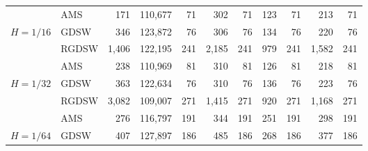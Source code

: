 \begin{table}[H]
\begin{tabular}{llrrrrrrrrr}
\cline{2-11}
\bfseries  & AMS & 171 & {\cellcolor[HTML]{E2E4FB}} \color[HTML]{000000} 110,677 & 71 & {\cellcolor[HTML]{ACB8F4}} \color[HTML]{000000} 302 & 71 & {\cellcolor[HTML]{768BEC}} \color[HTML]{F1F1F1} 123 & 71 & {\cellcolor[HTML]{405FE5}} \color[HTML]{F1F1F1} 213 & 71 \\
\cline{1-11} \cline{2-11}
\multirow[c]{3}{*}{\bfseries $H=1/16$} & GDSW & 346 & {\cellcolor[HTML]{E2E4FB}} \color[HTML]{000000} 123,872 & 76 & {\cellcolor[HTML]{405FE5}} \color[HTML]{F1F1F1} 306 & 76 & {\cellcolor[HTML]{ACB8F4}} \color[HTML]{000000} 134 & 76 & {\cellcolor[HTML]{768BEC}} \color[HTML]{F1F1F1} 220 & 76 \\
\cline{2-11}
\bfseries  & RGDSW & 1,406 & {\cellcolor[HTML]{E2E4FB}} \color[HTML]{000000} 122,195 & 241 & {\cellcolor[HTML]{ACB8F4}} \color[HTML]{000000} 2,185 & 241 & {\cellcolor[HTML]{768BEC}} \color[HTML]{F1F1F1} 979 & 241 & {\cellcolor[HTML]{405FE5}} \color[HTML]{F1F1F1} 1,582 & 241 \\
\cline{2-11}
\bfseries  & AMS & 238 & {\cellcolor[HTML]{E2E4FB}} \color[HTML]{000000} 110,969 & 81 & {\cellcolor[HTML]{768BEC}} \color[HTML]{F1F1F1} 310 & 81 & {\cellcolor[HTML]{ACB8F4}} \color[HTML]{000000} 126 & 81 & {\cellcolor[HTML]{405FE5}} \color[HTML]{F1F1F1} 218 & 81 \\
\cline{1-11} \cline{2-11}
\multirow[c]{3}{*}{\bfseries $H=1/32$} & GDSW & 363 & {\cellcolor[HTML]{E2E4FB}} \color[HTML]{000000} 122,634 & 76 & {\cellcolor[HTML]{405FE5}} \color[HTML]{F1F1F1} 310 & 76 & {\cellcolor[HTML]{ACB8F4}} \color[HTML]{000000} 136 & 76 & {\cellcolor[HTML]{768BEC}} \color[HTML]{F1F1F1} 223 & 76 \\
\cline{2-11}
\bfseries  & RGDSW & 3,082 & {\cellcolor[HTML]{E2E4FB}} \color[HTML]{000000} 109,007 & 271 & {\cellcolor[HTML]{405FE5}} \color[HTML]{F1F1F1} 1,415 & 271 & {\cellcolor[HTML]{ACB8F4}} \color[HTML]{000000} 920 & 271 & {\cellcolor[HTML]{768BEC}} \color[HTML]{F1F1F1} 1,168 & 271 \\
\cline{2-11}
\bfseries  & AMS & 276 & {\cellcolor[HTML]{E2E4FB}} \color[HTML]{000000} 116,797 & 191 & {\cellcolor[HTML]{ACB8F4}} \color[HTML]{000000} 344 & 191 & {\cellcolor[HTML]{768BEC}} \color[HTML]{F1F1F1} 251 & 191 & {\cellcolor[HTML]{405FE5}} \color[HTML]{F1F1F1} 298 & 191 \\
\cline{1-11} \cline{2-11}
\multirow[c]{3}{*}{\bfseries $H=1/64$} & GDSW & 407 & {\cellcolor[HTML]{E2E4FB}} \color[HTML]{000000} 127,897 & 186 & {\cellcolor[HTML]{768BEC}} \color[HTML]{F1F1F1} 485 & 186 & {\cellcolor[HTML]{ACB8F4}} \color[HTML]{000000} 268 & 186 & {\cellcolor[HTML]{405FE5}} \color[HTML]{F1F1F1} 377 & 186 \\

\end{tabular}
\end{table}
